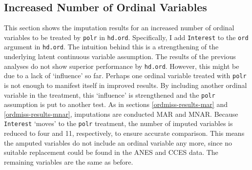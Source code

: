 \documentclass[12pt,econ]{sources/authesis}
\begin{document}
\hypertarget{ordmiss-results-increaseOrd}{%
\subsection{Increased Number of Ordinal Variables}\label{ordmiss-results-increaseOrd}}

This section shows the imputation results for an increased number of ordinal variables to be treated by \texttt{polr} in \texttt{hd.ord}. Specifically, I add \texttt{Interest} to the \texttt{ord} argument in \texttt{hd.ord}. The intuition behind this is a strengthening of the underlying latent continuous variable assumption. The results of the previous analyses do not show superior performance by \texttt{hd.ord}. However, this might be due to a lack of `influence' so far. Perhaps one ordinal variable treated with \texttt{polr} is not enough to manifest itself in improved results. By including another ordinal variable in the treatment, this `influence' is strengthened and the \texttt{polr} assumption is put to another test. As in sections \ref{ordmiss-results-mar} and \ref{ordmiss-results-mnar}, imputations are conducted MAR and MNAR. Because \texttt{Interest} `moves' to the \texttt{polr} treatment, the number of imputed variables is reduced to four and 11, respectively, to ensure accurate comparison. This means the amputed variables do not include an ordinal variable any more, since no suitable replacement could be found in the ANES and CCES data. The remaining variables are the same as before.
\end{document}
